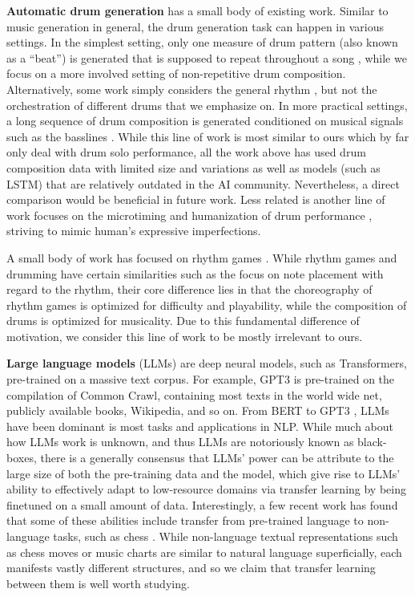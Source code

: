 \documentclass[letterpaper]{article} %
\begin{document}
\textbf{Automatic drum generation} has a small body of existing work. Similar to music generation in general, the drum generation task can happen in various settings. In the simplest setting, only one measure of drum pattern (also known as a ``beat'') is generated that is supposed to repeat throughout a song  \cite{vogl2017intelligent,bruford2020jaki,complexis21}, while we focus on a more involved setting of non-repetitive drum composition. Alternatively, some work simply considers the general rhythm \cite{lattner2019high}, but not the orchestration of different drums that we emphasize on. In more practical settings, a long sequence of drum composition is generated conditioned on musical signals such as the basslines \cite{makris2017combining,makris2019conditional}. While this line of work is most similar to ours which by far only deal with drum solo performance, all the work above has used drum composition data with limited size and variations as well as models (such as LSTM) that are relatively outdated in the AI community. Nevertheless, a direct comparison would be beneficial in future work. Less related is another line of work focuses on the microtiming and humanization of drum performance \cite{gillick2019learning,burloiu2020adaptive,burloiu2020interactive}, striving to mimic human's expressive imperfections.

A small body of work has focused on rhythm games \cite{donahue2017dance,liang2019procedural}. While rhythm games and drumming have certain similarities such as the focus on note placement with regard to the rhythm, their core difference lies in that the choreography of rhythm games is optimized for difficulty and playability, while the composition of drums is optimized for musicality. Due to this fundamental difference of motivation, we consider this line of work to be mostly irrelevant to ours.

\textbf{Large language models} (LLMs) are deep neural models, such as Transformers, pre-trained on a massive text corpus. For example, GPT3 is pre-trained on the compilation of Common Crawl, containing most texts in the world wide net, publicly available books, Wikipedia, and so on. From BERT \cite{devlin-etal-2019-bert} to GPT3 \cite{NEURIPS2020_1457c0d6}, LLMs have been dominant is most tasks and applications in NLP. While much about how LLMs work is unknown, and thus LLMs are notoriously known as black-boxes, there is a generally consensus that LLMs' power can be attribute to the large size of both the pre-training data and the model, which give rise to LLMs' ability to effectively adapt to low-resource domains via transfer learning by being finetuned on a small amount of data. Interestingly, a few recent work has found that some of these abilities include transfer from pre-trained language to non-language tasks, such as chess \cite{stockl-2021-watching}. While non-language textual representations such as chess moves or music charts are similar to natural language superficially, each manifests vastly different structures, and so we claim that transfer learning between them is well worth studying. 
\end{document}
